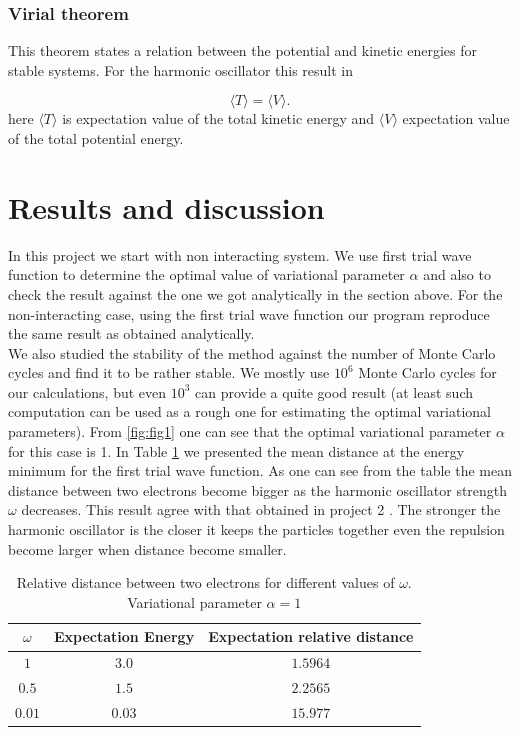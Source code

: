 \documentclass[10pt]{article}
\begin{document}
\subsubsection{Virial theorem}
This theorem states a relation between the potential and kinetic energies for stable systems. For the harmonic oscillator this result in 

\begin{equation*}
  \langle T \rangle= \langle V \rangle.
  \end{equation*}
here $\langle T \rangle$ is expectation value of the total kinetic energy and   $\langle V \rangle$ expectation value of the total potential energy.

\newpage
\section{Results and discussion}\label{results}

In this project we start with non interacting system. We use first trial wave function to determine the optimal value of variational parameter $\alpha$ and also to check the result against the one we got analytically in the section above. For the non-interacting case, using the first trial wave function our program reproduce the same result as obtained analytically. \\
We also studied the stability of the method against the number of Monte Carlo cycles and find it to be rather stable. We mostly use $10^6$ Monte Carlo cycles for our calculations, but even  $10^3$ can provide a quite good result (at least such computation can be used as a rough one for estimating the optimal variational parameters). 
From \ref{fig:fig1} one can see that the optimal variational parameter $\alpha$ for this case is 1. In Table \ref{tab:one} we presented the mean distance at the energy minimum for the first trial wave function. As one can see from the table the mean distance between two electrons become bigger as the harmonic oscillator strength $\omega$ decreases. This result agree with that obtained in project 2 \cite{proj2}. The stronger the harmonic oscillator is the closer it keeps the particles together even the repulsion become larger when distance become smaller. 

\begin{table}[h!]
  \caption{Relative distance between two electrons for different values of $\omega$. Variational parameter $\alpha =1$}
  \label{tab:one}
  \begin{center}
    \begin{tabular}{c|c|c}
    \hline
		$\omega$& Expectation Energy & Expectation relative distance \\
    \hline
	$	1 $  & $3.0$ & $1.5964$  \\
	$	0.5$  & $1.5$ & $2.2565$   \\
	$	0.01$  & $0.03$ &  $15.977$   \\
	\end{tabular}
  \end{center}
\end{table}
\end{document}
